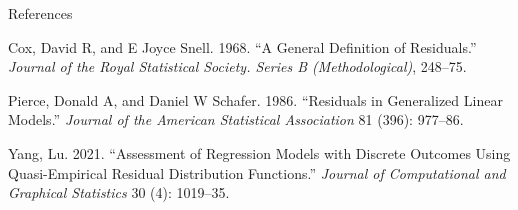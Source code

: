 \documentclass[
  ignorenonframetext,
]{beamer}
\newlength{\cslhangindent}
\newlength{\cslentryspacingunit} %
\newenvironment{CSLReferences}[2] %
 {%
  \setlength{\parindent}{0pt}
  \ifodd #1
  \let\oldpar\par
  \def\par{\hangindent=\cslhangindent\oldpar}
  \fi
  \setlength{\parskip}{#2\cslentryspacingunit}
 }%
 {}
\begin{document}
\begin{frame}{References}
\protect\hypertarget{references}{}
\hypertarget{refs}{}
\begin{CSLReferences}{1}{0}
\leavevmode{}%
Cox, David R, and E Joyce Snell. 1968. {``A General Definition of
Residuals.''} \emph{Journal of the Royal Statistical Society. Series B
(Methodological)}, 248--75.

\leavevmode{}%
Pierce, Donald A, and Daniel W Schafer. 1986. {``Residuals in
Generalized Linear Models.''} \emph{Journal of the American Statistical
Association} 81 (396): 977--86.

\leavevmode{}%
Yang, Lu. 2021. {``Assessment of Regression Models with Discrete
Outcomes Using Quasi-Empirical Residual Distribution Functions.''}
\emph{Journal of Computational and Graphical Statistics} 30 (4):
1019--35.

\end{CSLReferences}
\end{frame}
\end{document}
